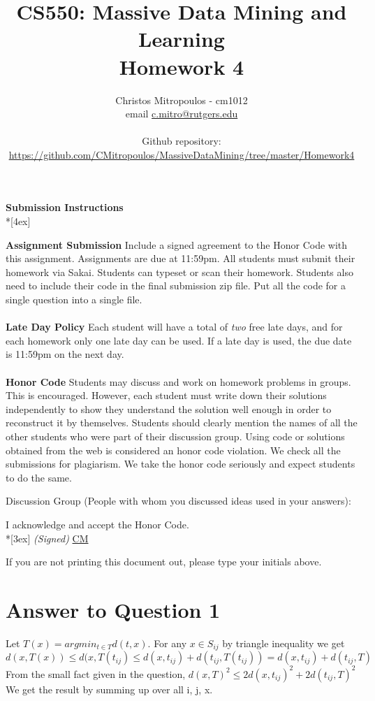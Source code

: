 \documentclass[11pt]{article}
\title{\LARGE{\bf \textsf{CS550: Massive Data Mining and Learning}}\\ {\bf \textsf{Homework 4}}}
\author{Christos Mitropoulos - cm1012 \\ email \href{mailto:c.mitro@rutgers.edu}{c.mitro@rutgers.edu} \\\\ Github repository:\\ \href{https://github.com/CMitropoulos/MassiveDataMining/tree/master/Homework4}{https://github.com/CMitropoulos/MassiveDataMining/tree/master/Homework4}}
\date{}
\begin{document}
\begin{titlepage}
\maketitle
\end{titlepage}

\pagebreak[4]
\begin{center}
\LARGE{\bf \textsf{Submission Instructions}} \\*[4ex]
\end{center}

\textbf{Assignment Submission } Include a signed agreement to the Honor Code with this assignment. Assignments are due at 11:59pm. All students must submit their homework via Sakai. Students can typeset or scan their homework. Students also need to include their code in the final submission zip file. Put all the code for a single question into a single file. 
\\
\\
\textbf{Late Day Policy } Each student will have a total of {\em two} free late days, and for each homework only one late day can be used. If a late day is used, the due date is 11:59pm on the next day.
\\
\\
\textbf{Honor Code } Students may discuss and work on homework problems in groups. This is encouraged. However, each student must write down their solutions independently to show they understand the solution well enough in order to reconstruct it by themselves.  Students should clearly mention the names of all the other students who were part of their discussion group. Using code or solutions obtained from the web is considered an honor code violation. We check all the submissions for plagiarism. We take the honor code seriously and expect students to do the same. 

\vfill
\vfill

Discussion Group (People with whom you discussed ideas used in your answers):


I acknowledge and accept the Honor Code.\\*[3ex]
\bigskip
\textit{(Signed)} \underline{CM} 

If you are not printing this document out, please type your initials above.

\vfill
\vfill


\pagebreak[4]
\section*{Answer to Question 1}
Let $T(x) = argmin_{t\in T}d(t,x)$. For any $x \in S_{ij}$ by triangle inequality we get 
$d(x, T(x)) \leq d(x, T(t_{ij}) \leq d(x, t_{ij}) + d(t_{ij}, T(t_{ij})) = d(x, t_{ij}) + d(t_{ij}, T)$ \\
From the small fact given in the question, $d(x,T)^2 \leq 2d(x, t_{ij})^2 + 2d(t_{ij},T)^2 $ \\
We get the result by summing up over all i, j, x.
\end{document}
